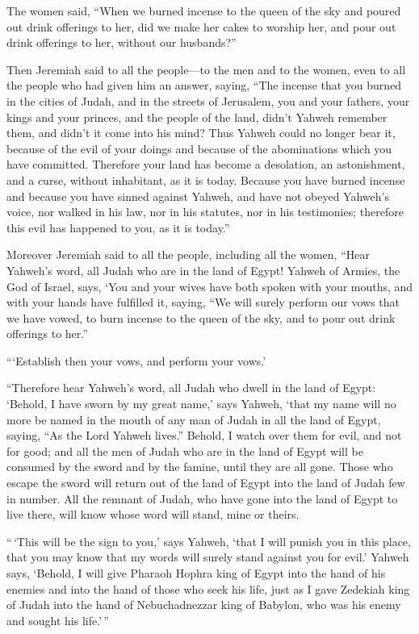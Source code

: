  The women said, ``When we burned incense to the queen of
the sky and poured out drink offerings to her, did we make her cakes to
worship her, and pour out drink offerings to her, without our
husbands?''

 Then Jeremiah said to all the people---to the men and to
the women, even to all the people who had given him an answer, saying,
 ``The incense that you burned in the cities of Judah, and
in the streets of Jerusalem, you and your fathers, your kings and your
princes, and the people of the land, didn't Yahweh remember them, and
didn't it come into his mind?  Thus Yahweh could no longer
bear it, because of the evil of your doings and because of the
abominations which you have committed. Therefore your land has become a
desolation, an astonishment, and a curse, without inhabitant, as it is
today.  Because you have burned incense and because you
have sinned against Yahweh, and have not obeyed Yahweh's voice, nor
walked in his law, nor in his statutes, nor in his testimonies;
therefore this evil has happened to you, as it is today.''

 Moreover Jeremiah said to all the people, including all
the women, ``Hear Yahweh's word, all Judah who are in the land of Egypt!
 Yahweh of Armies, the God of Israel, says, `You and your
wives have both spoken with your mouths, and with your hands have
fulfilled it, saying, ``We will surely perform our vows that we have
vowed, to burn incense to the queen of the sky, and to pour out drink
offerings to her.''

```Establish then your vows, and perform your vows.'

 ``Therefore hear Yahweh's word, all Judah who dwell in the
land of Egypt: `Behold, I have sworn by my great name,' says Yahweh,
`that my name will no more be named in the mouth of any man of Judah in
all the land of Egypt, saying, ``As the Lord Yahweh lives.''
 Behold, I watch over them for evil, and not for good; and
all the men of Judah who are in the land of Egypt will be consumed by
the sword and by the famine, until they are all gone. 
Those who escape the sword will return out of the land of Egypt into the
land of Judah few in number. All the remnant of Judah, who have gone
into the land of Egypt to live there, will know whose word will stand,
mine or theirs.

 ``\,`This will be the sign to you,' says Yahweh, `that I
will punish you in this place, that you may know that my words will
surely stand against you for evil.'  Yahweh says, `Behold,
I will give Pharaoh Hophra king of Egypt into the hand of his enemies
and into the hand of those who seek his life, just as I gave Zedekiah
king of Judah into the hand of Nebuchadnezzar king of Babylon, who was
his enemy and sought his life.'\,''

